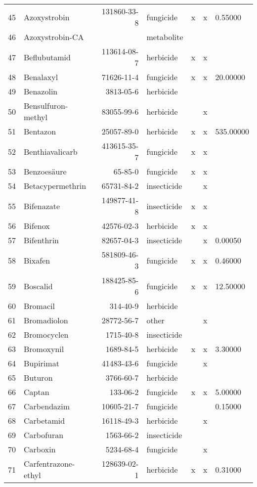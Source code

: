\begin{longtable}{lp{4cm}rlp{1.3cm}p{1.3cm}p{1.5cm}}
  45 & Azoxystrobin & 131860-33-8 & fungicide & x & x & 0.55000 \\ 
  46 & Azoxystrobin-CA &  & metabolite &  &  &  \\ 
  47 & Beflubutamid & 113614-08-7 & herbicide & x & x &  \\ 
  48 & Benalaxyl & 71626-11-4 & fungicide & x & x & 20.00000 \\ 
  49 & Benazolin & 3813-05-6 & herbicide &  &  &  \\ 
  50 & Bensulfuron-methyl & 83055-99-6 & herbicide &  & x &  \\ 
  51 & Bentazon & 25057-89-0 & herbicide & x & x & 535.00000 \\ 
  52 & Benthiavalicarb & 413615-35-7 & fungicide & x & x &  \\ 
  53 & Benzoesäure & 65-85-0 & fungicide & x & x &  \\ 
  54 & Betacypermethrin & 65731-84-2 & insecticide &  & x &  \\ 
  55 & Bifenazate & 149877-41-8 & insecticide & x & x &  \\ 
  56 & Bifenox & 42576-02-3 & herbicide & x & x &  \\ 
  57 & Bifenthrin & 82657-04-3 & insecticide &  & x & 0.00050 \\ 
  58 & Bixafen & 581809-46-3 & fungicide & x & x & 0.46000 \\ 
  59 & Boscalid & 188425-85-6 & fungicide & x & x & 12.50000 \\ 
  60 & Bromacil & 314-40-9 & herbicide &  &  &  \\ 
  61 & Bromadiolon & 28772-56-7 & other &  & x &  \\ 
  62 & Bromocyclen & 1715-40-8 & insecticide &  &  &  \\ 
  63 & Bromoxynil & 1689-84-5 & herbicide & x & x & 3.30000 \\ 
  64 & Bupirimat & 41483-43-6 & fungicide &  & x &  \\ 
  65 & Buturon & 3766-60-7 & herbicide &  &  &  \\ 
  66 & Captan & 133-06-2 & fungicide & x & x & 5.00000 \\ 
  67 & Carbendazim & 10605-21-7 & fungicide &  &  & 0.15000 \\ 
  68 & Carbetamid & 16118-49-3 & herbicide &  & x &  \\ 
  69 & Carbofuran & 1563-66-2 & insecticide &  &  &  \\ 
  70 & Carboxin & 5234-68-4 & fungicide &  & x &  \\ 
  71 & Carfentrazone-ethyl & 128639-02-1 & herbicide & x & x & 0.31000 \\ 

\end{longtable}
